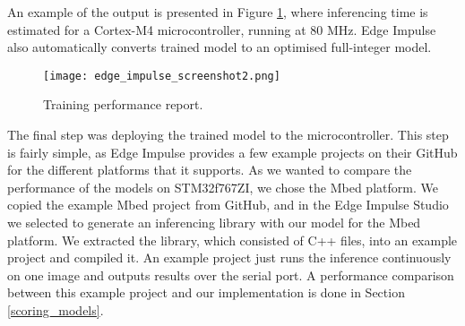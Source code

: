 An example of the output is presented in Figure \ref{edge_impulse_screenshot2}, where inferencing time is estimated for a Cortex-M4 microcontroller, running at 80 \si{\mega\hertz}.
Edge Impulse also automatically converts trained model to an optimised full-integer model.
\newline
\begin{figure}[ht]
    \centering
    \texttt{[image: edge\_impulse\_screenshot2.png]} 
    \caption{ Training performance report.}
    \label{edge_impulse_screenshot2}
\end{figure}

The final step was deploying the trained model to the microcontroller.
This step is fairly simple, as Edge Impulse provides a few example projects on their GitHub for the different platforms that it supports.
As we wanted to compare the performance of the models on STM32f767ZI, we chose the Mbed platform.
We copied the example Mbed project from GitHub, and in the Edge Impulse Studio we selected to generate an inferencing library with our model for the Mbed platform.
We extracted the library, which consisted of C++ files, into an example project and compiled it.
An example project just runs the inference continuously on one image and outputs results over the serial port.
A performance comparison between this example project and our implementation is done in Section \ref{scoring_models}.
